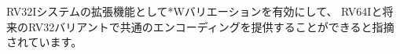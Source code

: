 \begin{commentary}
RV32Iシステムの拡張機能として*Wバリエーションを有効にして、
RV64Iと将来のRV32バリアントで共通のエンコーディングを提供することができると指摘されています。
\end{commentary}

\begin{comment}
\section{Memory}

A RISC-V hart has a single byte-addressable address space
of $2^{\text{XLEN}}$ bytes for all memory
accesses.  A {\em word} of memory is defined as \wunits{32}{bits}
(\wunits{4}{bytes}).  Correspondingly, a {\em halfword} is \wunits{16}{bits}
(\wunits{2}{bytes}), a {\em doubleword} is \wunits{64}{bits}
(\wunits{8}{bytes}), and a {\em quadword} is \wunits{128}{bits}
(\wunits{16}{bytes}).
The memory address space is circular, so that the byte at address
$2^{\text{XLEN}}-1$ is adjacent to the byte at address zero.  Accordingly, memory
address computations done by the hardware ignore overflow and instead
wrap around modulo $2^{\text{XLEN}}$.


The execution environment determines the mapping of hardware resources into
a hart's address space.
Different address ranges of a hart's address space may (1)~be vacant, or
(2)~contain {\em main memory}, or (3)~contain one or more {\em I/O devices}.
Reads and writes of I/O devices may have visible side effects, but accesses
to main memory cannot.
Although it is possible for the execution environment to call everything in
a hart's address space an I/O device, it is usually expected that some
portion will be specified as main memory.

When a RISC-V platform has multiple harts, the address spaces of any two
harts may be entirely the same, or entirely different, or may be partly
different but sharing some subset of resources, mapped into the same or
different address ranges.

\begin{commentary}
For a purely ``bare metal'' environment, all harts may see an identical
address space, accessed entirely by physical addresses.
However, when the execution environment includes an operating system
employing address translation, it is common for each hart to be given a
virtual address space that is largely or entirely its own.
\end{commentary}

Executing each RISC-V machine instruction entails one or more memory
accesses, subdivided into {\em
implicit} and {\em explicit} accesses.  For each instruction executed, an {\em
implicit} memory read (instruction fetch) is done to obtain the encoded
instruction to execute.  Many RISC-V instructions perform no further memory
accesses beyond instruction fetch.  Specific load and store instructions
perform an {\em explicit} read or write of memory at an address determined by
the instruction.  The execution environment may dictate that instruction
execution performs other {\em implicit} memory accesses (such as to implement
address translation) beyond those documented for the unprivileged ISA.


\end{comment}
